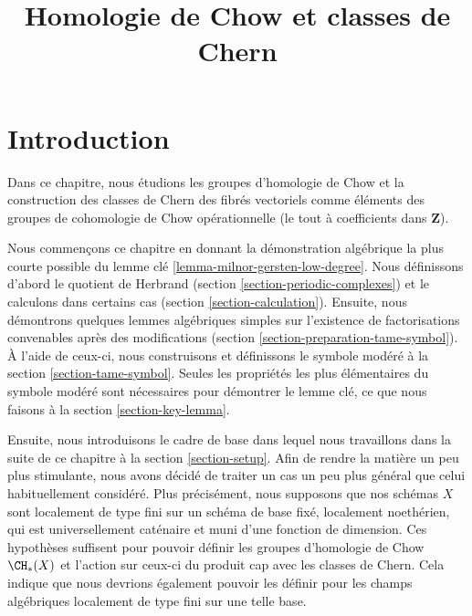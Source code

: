 

%


\title{Homologie de Chow et classes de Chern}

\maketitle

\label{section-phantom}


\tableofcontents


\section{Introduction}
\label{section-introduction}

\noindent
Dans ce chapitre, nous étudions les groupes d'homologie de Chow et la construction
des classes de Chern des fibrés vectoriels comme éléments des groupes
de cohomologie de Chow opérationnelle (le tout à coefficients dans $\mathbf{Z}$).

\medskip\noindent
Nous commençons ce chapitre en donnant la démonstration algébrique la plus courte
possible du lemme clé \ref{lemma-milnor-gersten-low-degree}.
Nous définissons d'abord le quotient de Herbrand
(section \ref{section-periodic-complexes})
et le calculons dans certains cas
(section \ref{section-calculation}).
Ensuite, nous démontrons quelques lemmes algébriques simples sur
l'existence de factorisations convenables après des modifications
(section \ref{section-preparation-tame-symbol}).
À l'aide de ceux-ci, nous construisons et définissons le symbole modéré à la
section \ref{section-tame-symbol}.
Seules les propriétés les plus élémentaires du symbole modéré
sont nécessaires pour démontrer le lemme clé, ce que nous faisons
à la section \ref{section-key-lemma}.

\medskip\noindent
Ensuite, nous introduisons le cadre de base dans lequel nous travaillons dans la suite de ce
chapitre à la section \ref{section-setup}. Afin de rendre la matière
un peu plus stimulante, nous avons décidé de traiter un cas un peu plus général
que celui habituellement considéré. Plus précisément, nous supposons que nos schémas $X$ sont localement
de type fini sur un schéma de base fixé, localement noethérien, qui est universellement
caténaire et muni d'une fonction de dimension. Ces hypothèses suffisent
pour pouvoir définir les groupes d'homologie de Chow $\CH_*(X)$ et l'action sur
ceux-ci du produit cap avec les classes de Chern. Cela indique que nous devrions
également pouvoir les définir pour les champs algébriques localement de type fini
sur une telle base.

